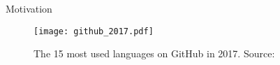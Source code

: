 \begin{section}{Motivation}

\begin{figure}[ht]
 \centering
 \texttt{[image: github\_2017.pdf]}
 \caption{The 15 most used languages on GitHub in 2017. Source: \cite{githuboctoverse}}
 \label{fig:github_2017}
\end{figure}

\end{section}

